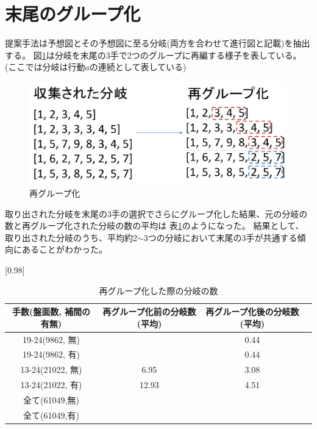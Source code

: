 \section{末尾のグループ化}
提案手法は予想図とその予想図に至る分岐(両方を合わせて進行図と記載)を抽出する。
図\ref{fig:regroup}は分岐を末尾の3手で2つのグループに再編する様子を表している。(ここでは分岐は行動$a$の連続として表している)
\begin{figure}[t]
	\centering
	\includegraphics[width=\linewidth]{./figure/regroup.pdf}
	\caption{再グループ化}
	\label{fig:regroup}
\end{figure}
取り出された分岐を末尾の3手の選択でさらにグループ化した結果、元の分岐の数と再グループ化された分岐の数の平均は
表\ref{table:tail}のようになった。
結果として、取り出された分岐のうち、平均約2$\sim$3つの分岐において末尾の3手が共通する傾向にあることがわかった。
\begin{table}[H]
	\caption{再グループ化した際の分岐の数}
    \scriptsize
    \label{table:tail}
	\centering
	\scalebox{0.98}[0.98]{
		\begin{tabular}{c|c|c||c}
			手数(盤面数, 補間の有無)&  再グループ化前の分岐数(平均)&  再グループ化後の分岐数(平均)\\ \hline
			19-24(9862, 無)    &  & 0.44  \\
			19-24(9862, 有)    &  & 0.44   \\
			13-24(21022, 無)   & 6.95 & 3.08  \\
			13-24(21022, 有)   & 12.93 & 4.51 \\
			全て(61049,無)& & \\
			全て(61049,有)&　&\\
		\end{tabular}
	}

	
\end{table}

